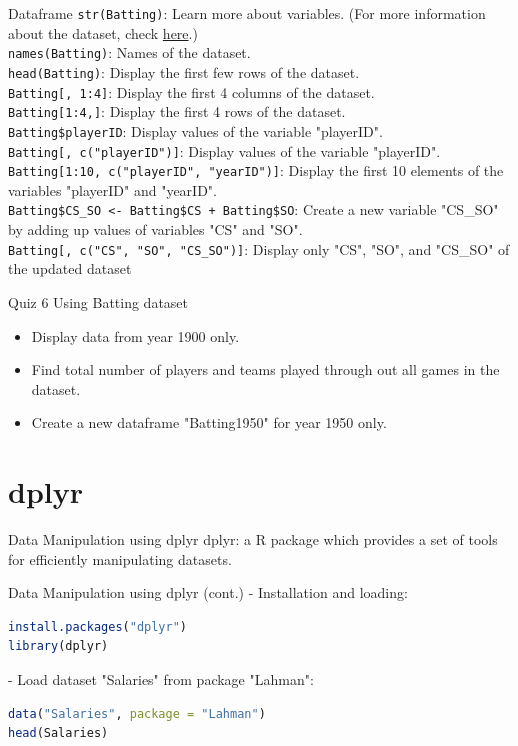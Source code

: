 \documentclass{beamer}
\begin{document}
\begin{frame}{Dataframe}
\texttt{str(Batting)}: Learn more about variables. (For more information about the dataset, check \href{https://rdrr.io/cran/Lahman/man/Batting.html}{here}.)\\
\texttt{names(Batting)}: Names of the dataset.\\
\texttt{head(Batting)}: Display the first few rows of the dataset.\\
\texttt{Batting[, 1:4]}: Display the first 4 columns of the dataset.\\
\texttt{Batting[1:4,]}: Display the first 4 rows of the dataset.\\
\texttt{Batting\$playerID}: Display values of the variable "playerID".\\
\texttt{Batting[, c("playerID")]}: Display values of the variable "playerID".\\
\texttt{Batting[1:10, c("playerID", "yearID")]}: Display the first 10 elements of the variables "playerID" and "yearID".\\
\texttt{Batting\$CS\_SO <- Batting\$CS + Batting\$SO}: Create a new variable "CS\_SO" by adding up values of variables "CS" and "SO".\\
\texttt{Batting[, c("CS", "SO", "CS\_SO")]}: Display only "CS", "SO", and "CS\_SO" of the updated dataset
\end{frame}

\begin{frame}{Quiz 6}
Using Batting dataset
\begin{itemize}
    \item Display data from year 1900 only.
    \item Find total number of players and teams played through out all games in the dataset.
    \item Create a new dataframe "Batting1950" for year 1950 only.
\end{itemize}
\end{frame}

\section{dplyr}

\begin{frame}{Data Manipulation using dplyr}
dplyr: a R package which provides a set of tools for efficiently manipulating datasets.
    
\end{frame}

\begin{frame}[fragile]{Data Manipulation using dplyr (cont.)}
- Installation and loading:
\begin{lstlisting}[language=R]
install.packages("dplyr")
library(dplyr)
\end{lstlisting}

- Load dataset "Salaries" from package "Lahman":
\begin{lstlisting}[language=R]
data("Salaries", package = "Lahman")
head(Salaries)
\end{lstlisting}
\end{frame}
\end{document}

